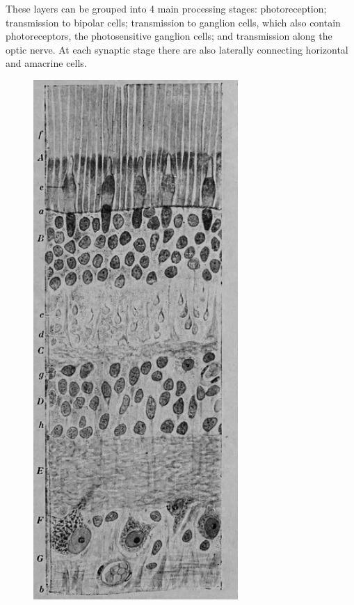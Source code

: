 These layers can be grouped into 4 main processing stages: photoreception; transmission to bipolar cells; transmission to ganglion cells, which also contain photoreceptors, the photosensitive ganglion cells; and transmission along the optic nerve. At each synaptic stage there are also laterally connecting horizontal and amacrine cells.



\begin{figure}

{\centering \includegraphics[width=0.7\linewidth]{./figures/visual/retina_cajal} 

}
\end{figure}
